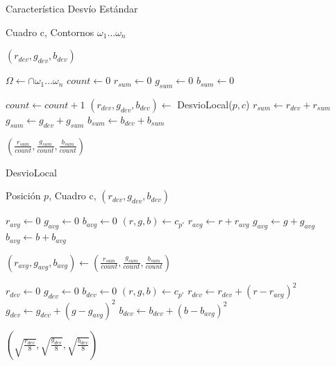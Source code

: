 \begin{algorithm}
    \caption{Característica Desvío Estándar}
    \label{alg:desvio}
    \begin{algorithmic}
    \Require\hspace{\algorithmicindent}\hspace{\algorithmicindent}Cuadro c, Contornos $\omega_1 \dots \omega_n$

    \Ensure\hspace{\algorithmicindent}\hspace{0.23cm} $(r_{dev}, g_{dev}, b_{dev})$
    \State

    \State $\Omega \gets \cap \omega_1 \dots \omega_n$
    \State $count \gets 0$
    \State $r_{sum} \gets 0$
    \State $g_{sum} \gets 0$
    \State $b_{sum} \gets 0$

            \State $count \gets count + 1$
            \State $(r_{dev}, g_{dev}, b_{dev}) \gets $ DesvioLocal($p, c$)
            \State $r_{sum} \gets r_{dev} + r_{sum}$
            \State $g_{sum} \gets g_{dev} + g_{sum}$
            \State $b_{sum} \gets b_{dev} + b_{sum}$
        \EndIf
    \EndFor

    \State \Return $ (\frac{r_{sum}}{count}, \frac{g_{sum}}{count}, \frac{b_{sum}}{count}) $
    \end{algorithmic}
\end{algorithm}

\begin{algorithm}[H]
    \caption{DesvioLocal}
    \label{alg:desvio-local}
    \begin{algorithmic}
    \Require\hspace{\algorithmicindent}\hspace{\algorithmicindent}Posición $p$, Cuadro c,
    \Ensure\hspace{\algorithmicindent}\hspace{0.23cm} $(r_{dev}, g_{dev}, b_{dev})$
    \State

    \State $r_{avg} \gets 0$
    \State $g_{avg} \gets 0$
    \State $b_{avg} \gets 0$
        \State $(r, g, b) \gets c_{p'}$
        \State $r_{avg} \gets r + r_{avg}$
        \State $g_{avg} \gets g + g_{avg}$
        \State $b_{avg} \gets b + b_{avg}$
    \EndFor

    \State $(r_{avg}, g_{avg}, b_{avg}) \gets (\frac{r_{sum}}{count}, \frac{g_{sum}}{count}, \frac{b_{sum}}{count}) $

    \State $r_{dev} \gets 0$
    \State $g_{dev} \gets 0$
    \State $b_{dev} \gets 0$
        \State $(r, g, b) \gets c_{p'}$
        \State $r_{dev} \gets r_{dev} + (r - r_{avg})^2$
        \State $g_{dev} \gets g_{dev} + (g - g_{avg})^2$
        \State $b_{dev} \gets b_{dev} + (b - b_{avg})^2$
    \EndFor

    \State \Return $ (\sqrt{\frac{r_{dev}}{8}}, \sqrt{\frac{g_{dev}}{8}}, \sqrt{\frac{b_{dev}}{8}}) $

    \end{algorithmic}
\end{algorithm}

